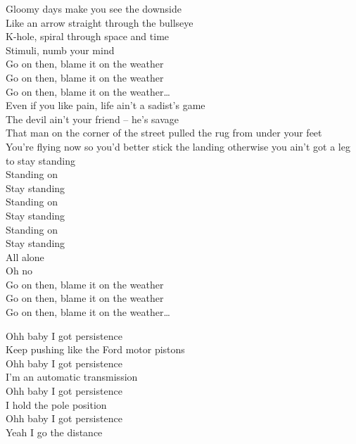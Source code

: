 Gloomy days make you see the downside\\
Like an arrow straight through the bullseye\\
K-hole, spiral through space and time\\
Stimuli, numb your mind\\

Go on then, blame it on the weather\\
Go on then, blame it on the weather\\
Go on then, blame it on the weather…\\

Even if you like pain, life ain't a sadist's game\\
The devil ain't your friend -- he's savage\\
That man on the corner of the street pulled the rug from under your feet\\
You're flying now so you'd better stick the landing otherwise you ain't got a leg to stay standing\\
Standing on\\

Stay standing\\
Standing on\\
Stay standing\\
Standing on\\
Stay standing\\
All alone\\
Oh no\\

Go on then, blame it on the weather\\
Go on then, blame it on the weather\\
Go on then, blame it on the weather…\\




Ohh baby I got persistence\\
Keep pushing like the Ford motor pistons\\
Ohh baby I got persistence\\
I'm an automatic transmission\\
Ohh baby I got persistence\\
I hold the pole position\\
Ohh baby I got persistence\\
Yeah I go the distance\\

